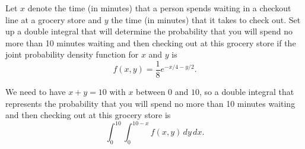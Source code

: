 \begin{activity} \label{A:11.4.7} Let $x$ denote the time (in minutes) that a person spends waiting in a checkout line at a grocery store and $y$ the time (in minutes) that it takes to check out. Set up a double integral that will determine the probability that you will spend no more than 10 minutes waiting and then checking out at this grocery store if the joint probability density function for $x$ and $y$ is
\[f(x,y) = \frac{1}{8} e^{-x/4-y/2}.\]

\end{activity}
\begin{smallhint}

\end{smallhint}
\begin{bighint}

\end{bighint}
\begin{activitySolution}
We need to have $x+y = 10$ with $x$ between 0 and $10$, so a double integral that represents the probability that you will spend no more than 10 minutes waiting and then checking out at this grocery store is
\[\int_0^{10} \int_0^{10-x} f(x,y) \, dy \, dx.\]
\end{activitySolution}
\aftera

